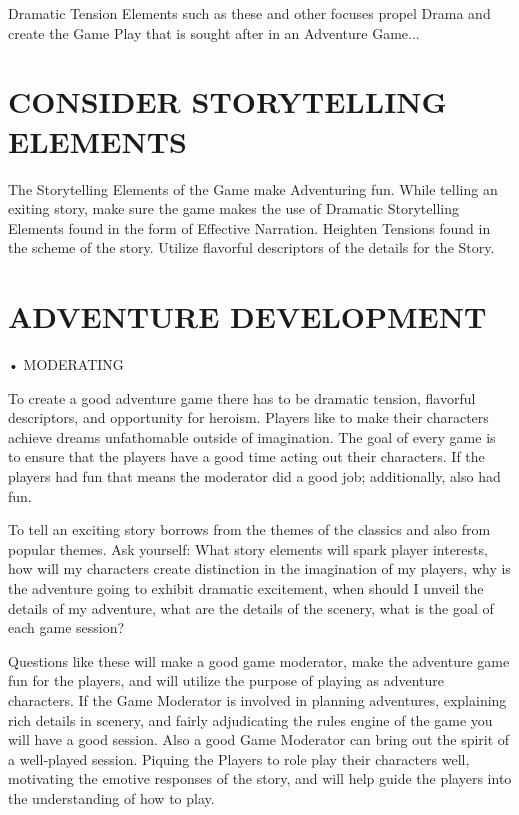 \documentclass{article}
\begin{document}
	Dramatic Tension Elements such as these and other focuses propel Drama and create the Game
Play that is sought after in an Adventure Game...

\section{CONSIDER STORYTELLING ELEMENTS}

	The Storytelling Elements of the Game make Adventuring fun. While telling an exiting story,
make sure the game makes the use of Dramatic Storytelling Elements found in the form of
Effective Narration. Heighten Tensions found in the scheme of the story. Utilize flavorful
descriptors of the details for the Story.

\section{ADVENTURE DEVELOPMENT}

• MODERATING

	To create a good adventure game there has to be dramatic tension, flavorful descriptors, and
opportunity for heroism. Players like to make their characters achieve dreams unfathomable
outside of imagination. The goal of every game is to ensure that the players have a good time
acting out their characters. If the players had fun that means the moderator did a good job;
additionally, also had fun.

	To tell an exciting story borrows from the themes of the classics and also from popular themes.
Ask yourself: What story elements will spark player interests, how will my characters create
distinction in the imagination of my players, why is the adventure going to exhibit dramatic
excitement, when should I unveil the details of my adventure, what are the details of the
scenery, what is the goal of each game session?

	Questions like these will make a good game moderator, make the adventure game fun for the
players, and will utilize the purpose of playing as adventure characters. If the Game
Moderator is involved in planning adventures, explaining rich details in scenery, and fairly
adjudicating the rules engine of the game you will have a good session.
Also a good Game Moderator can bring out the spirit of a well-played session. Piquing the
Players to role play their characters well, motivating the emotive responses of the story, and will
help guide the players into the understanding of how to play.
\end{document}
